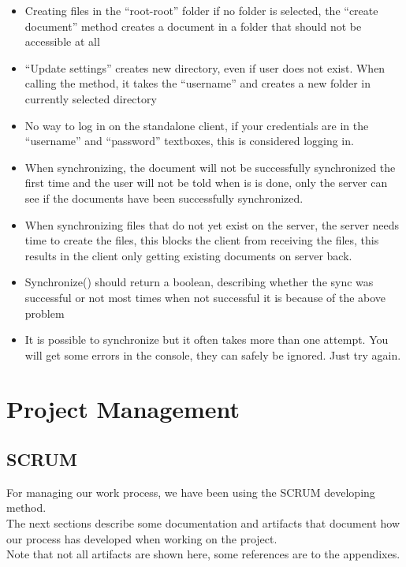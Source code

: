 \documentclass[11pt]{article}
\begin{document}
\begin{itemize}
\item Creating files in the ``root-root'' folder if no folder is selected, the 
     ``create document'' method creates a document in a folder that should not 
     be accessible at all
\item ``Update settings'' creates new directory, even if user does not exist.
     When calling the method, it takes the ``username'' and creates a new folder 
     in currently selected directory
\item No way to log in on the standalone client, if your credentials are in the 
     ``username'' and ``password'' textboxes, this is considered logging in.
\item When synchronizing, the document will not be successfully synchronized the first time
     and the user will not be told when is is done, only the server can see if the
     documents have been successfully synchronized.
\item When synchronizing files that do not yet exist on the server, the server needs time 
     to create the files, this blocks the client from receiving the files, this results in
     the client only getting existing documents on server back.
\item Synchronize() should return a boolean, describing whether the sync was successful or not
     most times when not successful it is because of the above problem
\item It is possible to synchronize but it often takes more than one attempt. You will get some errors in the console, they can safely be ignored. Just try again.
\end{itemize}
\newpage
\section{Project Management}
\label{sec-5}
\subsection{SCRUM}
\label{sec-5-1}
For managing our work process, we have been using the SCRUM developing method. \\
The next sections describe some documentation and artifacts that document how our process has developed when working on the project. \\
Note that not all artifacts are shown here, some references are to the appendixes. \\
\end{document}
